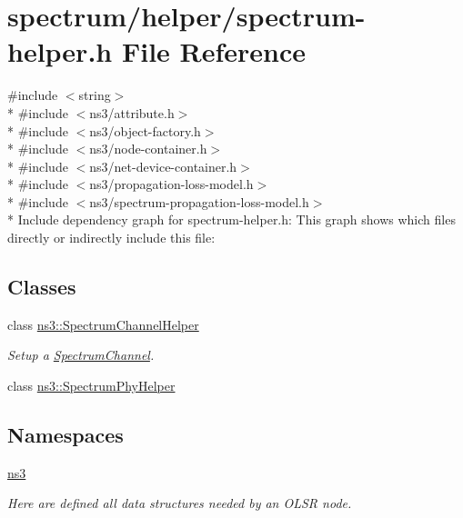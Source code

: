 \hypertarget{spectrum-helper_8h}{}\section{spectrum/helper/spectrum-\/helper.h File Reference}
\label{spectrum-helper_8h}
{\ttfamily \#include $<$string$>$}\\*
{\ttfamily \#include $<$ns3/attribute.\+h$>$}\\*
{\ttfamily \#include $<$ns3/object-\/factory.\+h$>$}\\*
{\ttfamily \#include $<$ns3/node-\/container.\+h$>$}\\*
{\ttfamily \#include $<$ns3/net-\/device-\/container.\+h$>$}\\*
{\ttfamily \#include $<$ns3/propagation-\/loss-\/model.\+h$>$}\\*
{\ttfamily \#include $<$ns3/spectrum-\/propagation-\/loss-\/model.\+h$>$}\\*
Include dependency graph for spectrum-\/helper.h\+:
This graph shows which files directly or indirectly include this file\+:
\subsection*{Classes}
\begin{DoxyCompactItemize}
\item 
class \hyperlink{classns3_1_1SpectrumChannelHelper}{ns3\+::\+Spectrum\+Channel\+Helper}
\begin{DoxyCompactList}\small\item\em Setup a \hyperlink{classns3_1_1SpectrumChannel}{Spectrum\+Channel}. \end{DoxyCompactList}\item 
class \hyperlink{classns3_1_1SpectrumPhyHelper}{ns3\+::\+Spectrum\+Phy\+Helper}
\end{DoxyCompactItemize}
\subsection*{Namespaces}
\begin{DoxyCompactItemize}
\item 
 \hyperlink{namespacens3}{ns3}
\begin{DoxyCompactList}\small\item\em Here are defined all data structures needed by an O\+L\+SR node. \end{DoxyCompactList}\end{DoxyCompactItemize}
